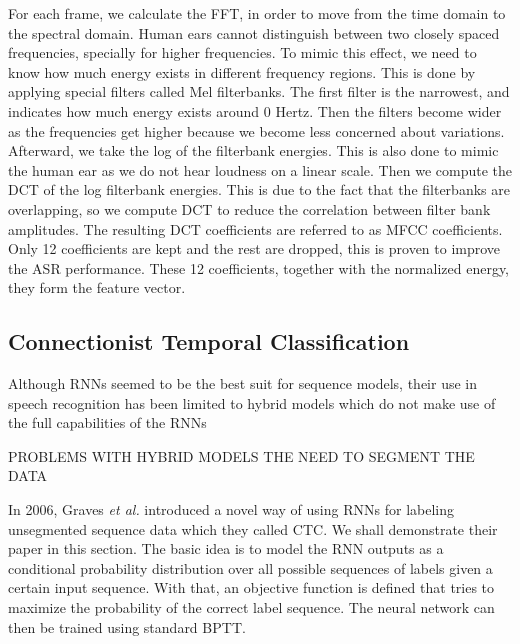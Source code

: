 For each frame, we calculate the \ac{FFT}, in order to move from the time domain to the spectral domain. Human ears cannot distinguish between two closely spaced frequencies, specially for higher frequencies. To mimic this effect, we need to know how much energy exists in different frequency regions. This is done by applying special filters called Mel filterbanks. The first filter is the narrowest, and indicates how much energy exists around 0 Hertz. Then the filters become wider as the frequencies get higher because we become less concerned about variations. 
Afterward, we take the log of the filterbank energies. This is also done to mimic the human ear as we do not hear loudness on a linear scale. 
Then we compute the \ac{DCT} of the log filterbank energies. This is due to the fact that the filterbanks are overlapping, so we compute \ac{DCT} to reduce the correlation between filter bank amplitudes. The resulting \ac{DCT} coefficients are referred to as MFCC coefficients. Only 12 coefficients are kept and the rest are dropped, this is proven to improve the \ac{ASR} performance. These 12 coefficients, together with the normalized energy, they form the feature vector.



\subsection{Connectionist Temporal Classification \cite{graves2006connectionist}} 
\label{bg:sub7}

Although \ac{RNN}s seemed to be the best suit for sequence models, their use in speech recognition has been limited to hybrid models which do not make use of the full capabilities of the \ac{RNN}s


PROBLEMS WITH HYBRID MODELS
THE NEED TO SEGMENT THE DATA


In 2006, Graves \textit{et al.} introduced a novel way of using \ac{RNN}s for labeling unsegmented sequence data which they called \ac{CTC}. We shall demonstrate their paper in this section. 
The basic idea is to model the \ac{RNN} outputs as a conditional probability distribution over all possible sequences of labels given a certain input sequence. With that, an objective function is defined that tries to maximize the probability of the correct label sequence. The neural network can then be trained using standard \ac{BPTT}.

